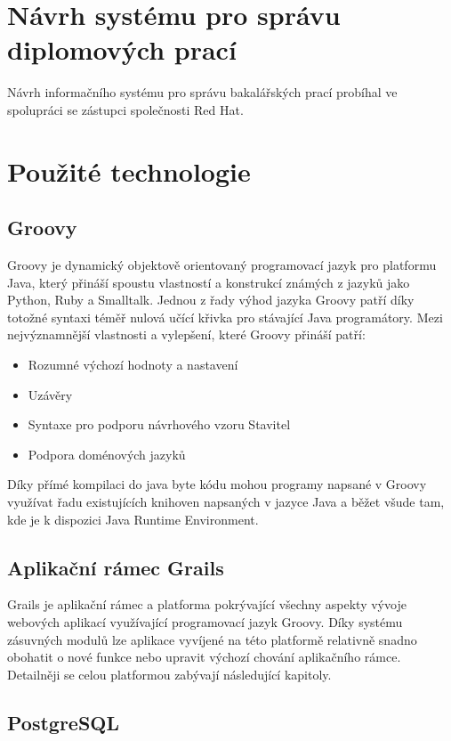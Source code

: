 \section{Návrh systému pro správu diplomových prací}
Návrh informačního systému pro správu bakalářských prací probíhal ve spolupráci se zástupci společnosti Red Hat.
\section{Použité technologie}

\subsection{Groovy}
Groovy je dynamický objektově orientovaný programovací jazyk pro platformu Java, který přináší spoustu vlastností a konstrukcí známých z jazyků jako Python, Ruby a Smalltalk. Jednou z řady výhod jazyka Groovy patří díky totožné syntaxi téměř nulová učící křivka pro stávající Java programátory. Mezi nejvýznamnější vlastnosti a vylepšení, které Groovy přináší patří:

\begin{itemize}
\item Rozumné výchozí hodnoty a nastavení
\item Uzávěry
\item Syntaxe pro podporu návrhového vzoru Stavitel
\item Podpora doménových jazyků
\end{itemize}

Díky přímé kompilaci do java byte kódu mohou programy napsané v Groovy využívat řadu existujících knihoven napsaných v jazyce Java a běžet všude tam, kde je k dispozici Java Runtime Environment.

\subsection{Aplikační rámec Grails}
Grails je aplikační rámec a platforma pokrývající všechny aspekty vývoje webových aplikací využívající programovací jazyk Groovy. Díky systému zásuvných modulů lze aplikace vyvíjené na této platformě relativně snadno obohatit o nové funkce nebo upravit výchozí chování aplikačního rámce. Detailněji se celou platformou zabývají následující kapitoly.

\subsection{PostgreSQL}

